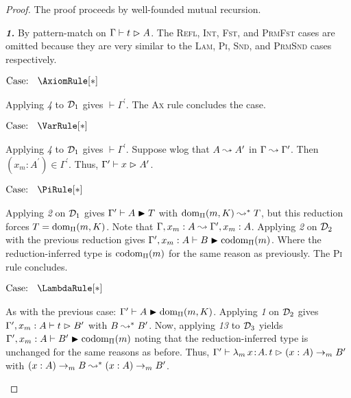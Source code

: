 \begin{proof}
    The proof proceeds by well-founded mutual recursion.

    \textbf{\textit{1.}} By pattern-match on $\Gamma \vdash t \vartriangleright A$.
    The \textsc{Refl}, \textsc{Int}, \textsc{Fst}, and \textsc{PrmFst} cases are omitted because they are very similar to the \textsc{Lam}, \textsc{Pi}, \textsc{Snd}, and \textsc{PrmSnd} cases respectively.

    $\text{Case: }\begin{array}{c} \AxiomRule[*] \end{array}$
    \begin{proofcase}
        Applying \textit{4} to $\mathcal{D}_{1}$ gives $\vdash \Gamma^\prime$.
        The \textsc{Ax} rule concludes the case.
    \end{proofcase}

    $\text{Case: }\begin{array}{c} \VarRule[*] \end{array}$
    \begin{proofcase}
        Applying \textit{4} to $\mathcal{D}_{1}$ gives $\vdash \Gamma^\prime$.
        Suppose wlog that $A \leadsto A^\prime$ in $\Gamma \leadsto \Gamma^\prime$.
        Then $(x_m : A^\prime) \in \Gamma^\prime$.
        Thus, $\Gamma^\prime \vdash x \vartriangleright A^\prime$.
    \end{proofcase}

    $\text{Case: }\begin{array}{c} \PiRule[*] \end{array}$
    \begin{proofcase}
        Applying \textit{2} on $\mathcal{D}_{1}$ gives $\Gamma^\prime \vdash A \blacktriangleright T$ with $\mbox{\normalfont dom}_\Pi(m, K) \leadsto^* T$, but this reduction forces $T = \mbox{\normalfont dom}_\Pi(m, K)$.
        Note that $\Gamma, x_m : A \leadsto \Gamma^\prime, x_m : A$.
        Applying \textit{2} on $\mathcal{D}_{2}$ with the previous reduction gives $\Gamma^\prime, x_m : A \vdash B \blacktriangleright \mbox{\normalfont codom}_\Pi(m)$.
        Where the reduction-inferred type is $\mbox{\normalfont codom}_\Pi(m)$ for the same reason as previously.
        The \textsc{Pi} rule concludes.
    \end{proofcase}

    $\text{Case: }\begin{array}{c} \LambdaRule[*] \end{array}$
    \begin{proofcase}
        As with the previous case: $\Gamma^\prime \vdash A \blacktriangleright \mbox{\normalfont dom}_\Pi(m, K)$.
        Applying \textit{1} on $\mathcal{D}_{2}$ gives $\Gamma^\prime, x_m : A \vdash t \vartriangleright B^\prime$ with $B \leadsto^* B^\prime$.
        Now, applying \textit{13} to $\mathcal{D}_{3}$ yields $\Gamma^\prime, x_m : A \vdash B^\prime \blacktriangleright \mbox{\normalfont codom}_\Pi(m)$ noting that the reduction-inferred type is unchanged for the same reasons as before.
        Thus, $\Gamma^\prime \vdash {\lambda_m}\, x\! : \! A.\, t \vartriangleright (x : A) \to_m B^\prime$ with $(x : A) \to_m B \leadsto^* (x : A) \to_m B^\prime$.
    \end{proofcase}


\end{proof}
